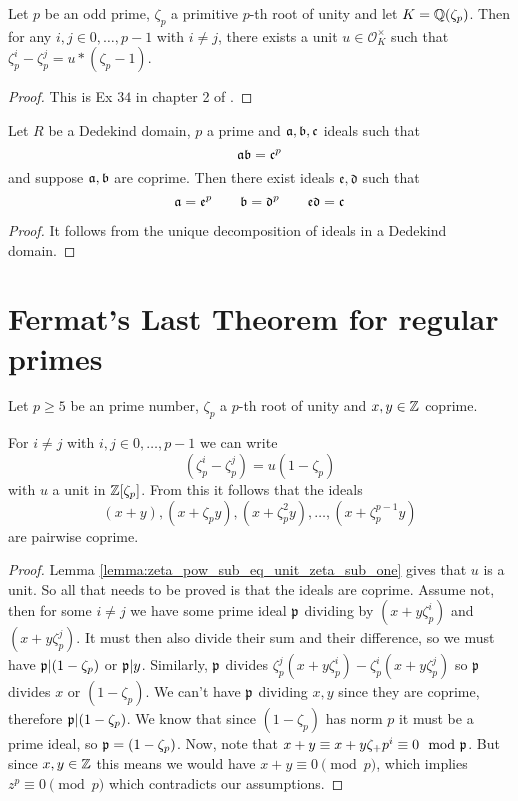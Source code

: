 \begin{lemma}\label{lemma:zeta_pow_sub_eq_unit_zeta_sub_one}
	\leanok
Let $p$ be an odd prime, $\zeta_p$ a primitive $p$-th root of unity and let $K=\mathbb{Q}(\zeta_p)$. Then for any $i,j \in {0,\dots,p-1}$ with $i \ne j$, there exists a unit $u \in \mathcal{O}_K^\times$ such that $\zeta_p^i-\zeta_p^j = u * (\zeta_p-1)$.
\end{lemma}
\begin{proof}
	\leanok
	This is Ex $34$ in chapter 2 of \cite{marcus}.
\end{proof}


\begin{lemma}\label{lemma:ideals_mult_to_power}
    \leanok
	Let $R$ be a Dedekind domain, $p$ a prime and $\mathfrak{a},\mathfrak{b},\mathfrak{c}$ ideals such that \[\mathfrak{a}\mathfrak{b}=\mathfrak{c}^p\] and suppose $\mathfrak{a},\mathfrak{b}$ are coprime. Then there exist ideals $\mathfrak{e},\mathfrak{d}$ such that \[\mathfrak{a}=\mathfrak{e}^p \qquad \mathfrak{b}=\mathfrak{d}^p \qquad \mathfrak{e}\mathfrak{d}=\mathfrak{c}\]
\end{lemma}
\begin{proof}
 \leanok
 It follows from the unique decomposition of ideals in a Dedekind domain.
\end{proof}


\section{Fermat's Last Theorem for regular primes}

\begin{lemma}\label{lem:flt_ideals_coprime}
	\leanok
	Let $p \geq 5$ be an prime number, $\zeta_p$ a $p$-th root of unity and $x, y \in \mathbb{Z}$ coprime.

	 For $i \neq j$ with $i,j \in {0,\dots,p-1}$ we can write \[(\zeta_p^i-\zeta_p^j)=u(1-\zeta_p)\] with $u$ a unit in $\mathbb{Z}[\zeta_p]$. From this it follows that the ideals \[(x+y),(x+\zeta_py),(x+\zeta_p^2y),\dots,(x+\zeta_p^{p-1}y)\] are pairwise coprime.
\end{lemma}
\begin{proof}
	 Lemma \ref{lemma:zeta_pow_sub_eq_unit_zeta_sub_one} gives that $u$ is a unit. So all that needs to be proved is that the ideals are coprime. Assume not, then for some $i \neq j$ we have some prime ideal $\mathfrak{p}$ dividing by $(x+y\zeta_p^i)$ and $(x+y\zeta_p^j)$. It must then also divide their sum and their difference, so we must have $\mathfrak{p} | (1-\zeta_p)$ or $\mathfrak{p} | y$. Similarly, $\mathfrak{p}$ divides $\zeta_p^j(x+y\zeta_p^i)-\zeta_p^i(x+y\zeta_p^j)$ so $\mathfrak{p}$ divides $x$ or $(1-\zeta_p)$. We can't have $\mathfrak{p}$ dividing $x,y$ since they are coprime, therefore $\mathfrak{p} |(1-\zeta_p)$. We know that since $(1-\zeta_p)$ has norm $p$ it must be a prime ideal, so $\mathfrak{p}=(1-\zeta_p)$. Now, note that $x+y \equiv x+y\zeta_+p^i \equiv 0 \mod {\mathfrak{p}}$. But since $x,y \in \mathbb{Z}$ this means we would have $x+y \equiv 0 \pmod p$, which implies $z^p \equiv 0 \pmod p$ which contradicts our assumptions.
\end{proof}


